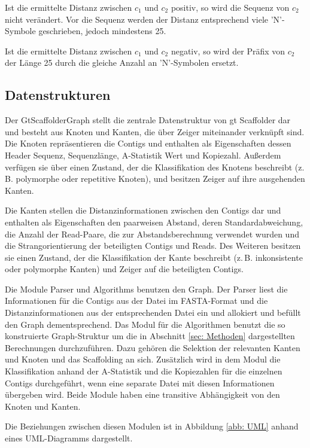 \documentclass[a4paper,11pt,parskip,abstract=on]{scrartcl}
\begin{document}
Ist die ermittelte Distanz zwischen $c_1$ und $c_2$ positiv, so wird
die Sequenz von $c_2$ nicht verändert. Vor die Sequenz werden der
Distanz entsprechend viele 'N'-Symbole geschrieben, jedoch mindestens
25.

Ist die ermittelte Distanz zwischen $c_1$ und $c_2$ negativ, so wird
der Präfix von $c_2$ der Länge 25 durch die gleiche Anzahl an
'N'-Symbolen ersetzt.

\subsection{Datenstrukturen}
\label{sec: Datenstrukturen}

Der GtScaffolderGraph stellt die zentrale Datenstruktur von gt Scaffolder dar
und besteht aus Knoten und Kanten, die über Zeiger miteinander verknüpft sind.
Die Knoten repräsentieren die Contigs und enthalten als Eigenschaften dessen
Header Sequenz, Sequenzlänge, A-Statistik Wert und Kopiezahl. Außerdem
verfügen sie über einen Zustand, der die Klassifikation des Knotens beschreibt
(z.\,B. polymorphe oder repetitive Knoten), und besitzen Zeiger auf ihre ausgehenden
Kanten.

Die Kanten stellen die Distanzinformationen zwischen den Contigs dar und
enthalten als Eigenschaften den paarweisen Abstand, deren Standardabweichung,
die Anzahl der Read-Paare, die zur Abstandsberechnung verwendet wurden und die
Strangorientierung der beteiligten Contigs und Reads. Des Weiteren besitzen sie einen
Zustand, der die Klassifikation der Kante beschreibt (z.\,B. inkonsistente oder
polymorphe Kanten) und Zeiger auf die beteiligten Contigs.

Die Module Parser und Algorithms benutzen den Graph. Der Parser liest
die Informationen für die Contigs aus der Datei im FASTA-Format und
die Distanzinformationen aus der entsprechenden Datei ein und
allokiert und befüllt den Graph dementsprechend. Das Modul für die
Algorithmen benutzt die so konstruierte Graph-Struktur um die in
Abschnitt \ref{sec: Methoden} dargestellten Berechnungen
durchzuführen. Dazu gehören die Selektion der relevanten Kanten und
Knoten und das Scaffolding an sich. Zusätzlich wird in dem Modul die
Klassifikation anhand der A-Statistik und die Kopiezahlen für die
einzelnen Contigs durchgeführt, wenn eine separate Datei mit diesen
Informationen übergeben wird. Beide Module haben eine transitive
Abhängigkeit von den Knoten und Kanten.

Die Beziehungen zwischen diesen Modulen ist in Abbildung \ref{abb:
  UML} anhand eines UML-Diagramms dargestellt.
\end{document}

